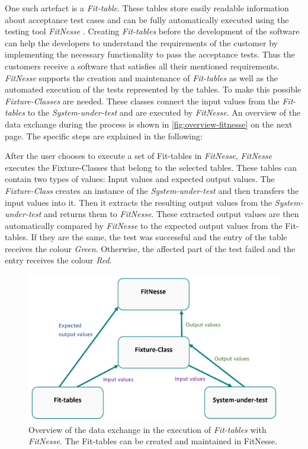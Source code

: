 One such artefact is a \textit{Fit-table}. 
These tables store easily readable information about acceptance test cases and can be fully automatically executed using the testing tool \textit{FitNesse} \cite{fitnesse}.
Creating \textit{Fit-tables} before the development of the software can help the developers to understand the requirements of the customer by implementing the necessary functionality to pass the acceptance tests.
Thus the customers receive a software that satisfies all their mentioned requirements.
\textit{FitNesse} supports the creation and maintenance of \textit{Fit-tables} as well as the automated execution of the tests represented by the tables.
To make this possible \textit{Fixture-Classes} are needed.
These classes connect the input values from the \textit{Fit-tables} to the \textit{System-under-test} and are executed by \textit{FitNesse}.
An overview of the data exchange during the process is shown in  \autoref{fig:overview-fitnesse} on the next page.
The specific steps are explained in the following:

After the user chooses to execute a set of Fit-tables in \textit{FitNesse}, \textit{FitNesse} executes the Fixture-Classes that belong to the selected tables.
These tables can contain two types of values: Input values and expected output values.
The \textit{Fixture-Class} creates an instance of the \textit{System-under-test} and then transfers the input values into it.
Then it extracts the resulting output values from the \textit{System-under-test} and returns them to \textit{FitNesse}.
These extracted output values are then automatically compared by \textit{FitNesse} to the expected output values from the Fit-tables.
If they are the same, the test was successful and the entry of the table receives the colour \textit{Green}.
Otherwise, the affected part of the test failed and the entry receives the colour \textit{Red}.

\begin{figure}[H]
	\centering
	\includegraphics[width=.75\textwidth]{../images/fitnesse-overview.png}
	\caption{Overview of the data exchange in the execution of \textit{Fit-tables} with \textit{FitNesse}. The Fit-tables can be created and maintained in FitNesse.}
	\label{fig:overview-fitnesse}
\end{figure}


